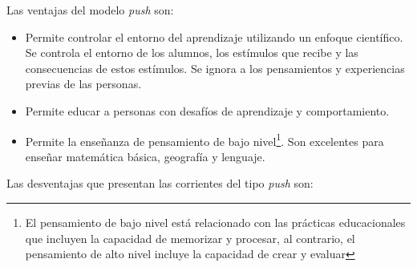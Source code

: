 Las ventajas del modelo \textit{push} son:

\begin{itemize}

\item Permite controlar el entorno del aprendizaje utilizando un enfoque
    científico. Se controla el entorno de los alumnos, los estímulos que recibe
    y las consecuencias de estos estímulos. Se ignora a los pensamientos y
    experiencias previas de las personas\cite{weegar2012comparison}.

\item Permite educar a personas con desafíos de aprendizaje y
    comportamiento\cite{johnson2005instructionism}.

\item Permite la enseñanza de pensamiento de bajo nivel\footnote{El pensamiento
        de bajo nivel está relacionado con las prácticas educacionales que
        incluyen la capacidad de memorizar y procesar, al contrario, el
        pensamiento de alto nivel incluye la capacidad de crear y
        evaluar\cite{edwards2000higher}}. Son excelentes para enseñar matemática
    básica, geografía y lenguaje\cite{charsky:2010}.

\end{itemize}

Las desventajas que presentan las corrientes del tipo \textit{push} son:

